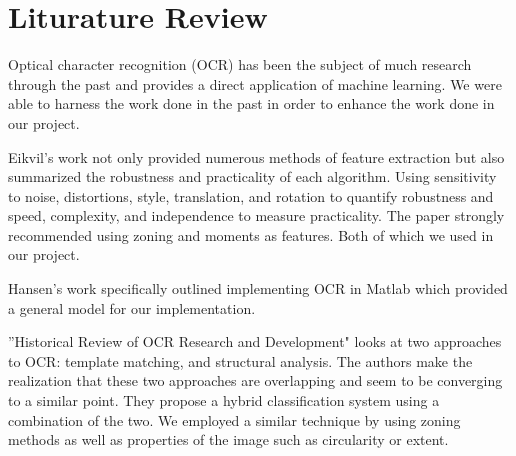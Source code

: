 \section{Liturature Review}

Optical character recognition (OCR) has been the subject of much research through the past and provides a direct application of machine learning. We were able to harness the work done in the past in order to enhance the work done in our project. 

Eikvil's work \cite{one} not only provided numerous methods of feature extraction but also summarized the robustness and practicality of each algorithm. Using sensitivity to noise, distortions, style, translation, and rotation to quantify robustness and speed, complexity, and independence to measure practicality. The paper strongly recommended using zoning and moments as features. Both of which we used in our project.

Hansen's work \cite{two} specifically outlined implementing OCR in Matlab which provided a general model for our implementation.

''Historical Review of OCR Research and Development" \cite{three} looks at two approaches to OCR: template matching, and structural analysis. The authors make the realization that these two approaches are overlapping and seem to be converging to a similar point. They propose a hybrid classification system using a combination of the two. We employed a similar technique by using zoning methods as well as properties of the image such as circularity or extent.